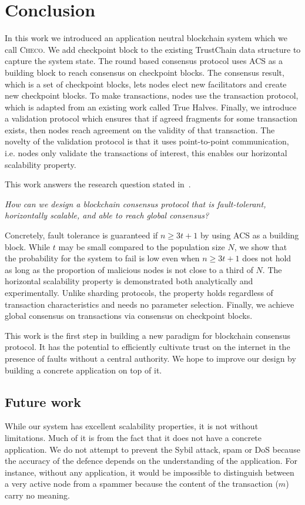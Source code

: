 \chapter{Conclusion}
\label{ch:conclusion}

In this work we introduced an application neutral blockchain system which we call \textsc{Checo}.
We add checkpoint block to the existing TrustChain data structure to capture the system state.
The round based consensus protocol uses ACS as a building block to reach consensus on checkpoint blocks.
The consensus result, which is a set of checkpoint blocks, lets nodes elect new facilitators and create new checkpoint blocks.
To make transactions, nodes use the transaction protocol,
which is adapted from an existing work called True Halves.
Finally, we introduce a validation protocol which ensures that if agreed fragments for some transaction exists,
then nodes reach agreement on the validity of that transaction.
The novelty of the validation protocol is that it uses point-to-point communication,
i.e. nodes only validate the transactions of interest,
this enables our horizontal scalability property.

This work answers the research question stated in~.
\begin{displayquote}
\emph{How can we design a blockchain consensus protocol that is fault-tolerant,
horizontally scalable,
and able to reach global consensus?}
\end{displayquote}
Concretely, fault tolerance is guaranteed if $n \ge 3t + 1$ by using ACS as a building block.
While $t$ may be small compared to the population size $N$,
we show that the probability for the system to fail is low even when $n \ge 3t + 1$ does not hold as long as the proportion of malicious nodes is not close to a third of $N$.
The horizontal scalability property is demonstrated both analytically and experimentally.
Unlike sharding protocols, the property holds regardless of transaction characteristics and needs no parameter selection.
Finally, we achieve global consensus on transactions via consensus on checkpoint blocks.

This work is the first step in building a new paradigm for blockchain consensus protocol.
It has the potential to efficiently cultivate trust on the internet in the presence of faults without a central authority.
We hope to improve our design by building a concrete application on top of it.

\section{Future work}
While our system has excellent scalability properties, it is not without limitations.
Much of it is from the fact that it does not have a concrete application.
We do not attempt to prevent the Sybil attack, spam or DoS because the accuracy of the defence depends on the understanding of the application.
For instance, without any application, it would be impossible to distinguish between a very active node from a spammer because the content of the transaction ($m$) carry no meaning.

